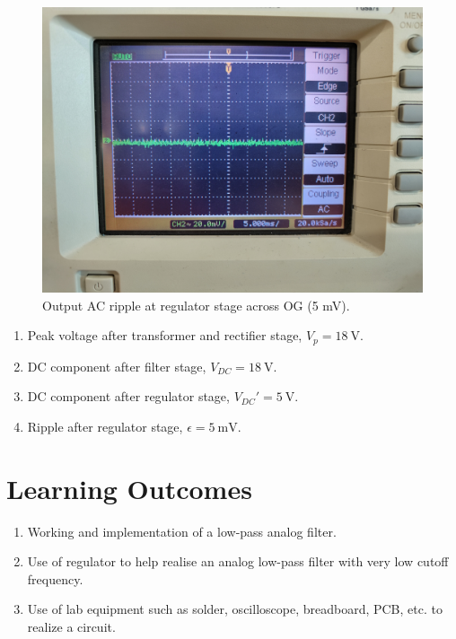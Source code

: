 \documentclass[journal,12pt,twocolumn]{IEEEtran}
\begin{document}
\begin{figure}[!ht]
    \includegraphics[width=\columnwidth]{figs/regulator_ac.jpg}
    \caption{Output AC ripple at regulator stage across OG (5 mV).}
    \label{fig:regulator_ac}
\end{figure}

\begin{enumerate}
    \item Peak voltage after transformer and rectifier stage, 
        $V_p = \SI[parse-numbers=false]{18}{\V}$.
    \item DC component after filter stage, 
        $V_{DC} = \SI[parse-numbers=false]{18}{\V}$.
    \item DC component after regulator stage, $V_{DC}' = \SI{5}{\V}$.
    \item Ripple after regulator stage, $\epsilon = \SI{5}{\milli\V}$.
\end{enumerate}

\section{Learning Outcomes}
\begin{enumerate}
    \item Working and implementation of a low-pass analog filter.
    \item Use of regulator to help realise an analog low-pass filter with
        very low cutoff frequency.
    \item Use of lab equipment such as solder, oscilloscope, breadboard, PCB, etc.
        to realize a circuit.
\end{enumerate}
\end{document}
